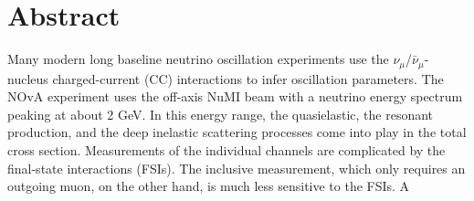 \documentclass[12pt,letterpaper,oneside,openright]{book}
\begin{document}
\chapter*{\centering Abstract}
\begin{sloppypar}
Many modern long baseline neutrino oscillation experiments use the $\nu_\mu$/$\bar{\nu}_\mu$-nucleus charged-current (CC) interactions to infer oscillation parameters. The NOvA experiment uses the off-axis NuMI beam with a neutrino energy spectrum peaking at about 2 GeV. In this energy range, the quasielastic, the resonant production, and the deep inelastic scattering processes come into play in the total cross section. Measurements of the individual channels are complicated by the final-state interactions (FSIs). The inclusive measurement, which only requires an outgoing muon, on the other hand, is much less sensitive to the FSIs. A 
\end{sloppypar}
\end{document}
